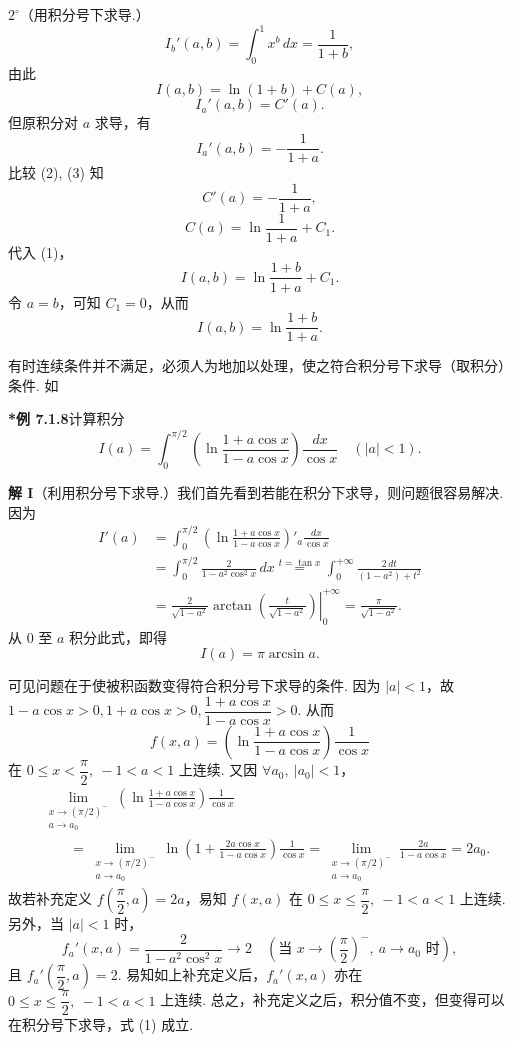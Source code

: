\documentclass[UTF8,12pt,a4paper,fontset=fandol]{ctexart}
\begin{document}
$2^\circ$（用积分号下求导.）
\[
I_b'(a,b)=\int_0^1x^b\,dx=\frac1{1+b},
\]
由此
\begin{equation}
I(a,b)=\ln(1+b)+C(a),
\tag{1}
\end{equation}
\begin{equation}
I_a'(a,b)=C'(a).
\tag{2}
\end{equation}
但原积分对 $a$ 求导，有
\begin{equation}
I_a'(a,b)=-\frac1{1+a}.
\tag{3}
\end{equation}
比较 (2), (3) 知
\[
C'(a)=-\frac1{1+a},
\]
\[
C(a)=\ln\frac1{1+a}+C_1.
\]
代入 (1)，
\[
I(a,b)=\ln\frac{1+b}{1+a}+C_1.
\]
令 $a=b$，可知 $C_1=0$，从而
\[
I(a,b)=\ln\frac{1+b}{1+a}.
\]

有时连续条件并不满足，必须人为地加以处理，使之符合积分号下求导（取积分）条件. 如

\noindent\textbf{*例 7.1.8}\quad 计算积分
\[
I(a)=\int_0^{\pi/2}\left(\ln\frac{1+a\cos x}{1-a\cos x}\right)\frac{dx}{\cos x}\quad(|a|<1).
\]

\noindent\textbf{解 I}\quad （利用积分号下求导.）我们首先看到若能在积分下求导，则问题很容易解决. 因为
\[
\begin{aligned}
I'(a)
&=\int_0^{\pi/2}\left(\ln\frac{1+a\cos x}{1-a\cos x}\right)'_a\frac{dx}{\cos x}\\
&=\int_0^{\pi/2}\frac{2}{1-a^2\cos^2x}\,dx
\stackrel{t=\tan x}{=}\int_0^{+\infty}\frac{2\,dt}{(1-a^2)+t^2}\\
&=\left.\frac{2}{\sqrt{1-a^2}}
\arctan\left(\frac{t}{\sqrt{1-a^2}}\right)\right|_0^{+\infty}
=\frac{\pi}{\sqrt{1-a^2}}.
\end{aligned}
\tag{1}
\]
从 $0$ 至 $a$ 积分此式，即得
\[
I(a)=\pi\arcsin a.
\]

可见问题在于使被积函数变得符合积分号下求导的条件. 因为 $|a|<1$，故 $1-a\cos x>0,1+a\cos x>0,\dfrac{1+a\cos x}{1-a\cos x}>0$. 从而
\[
f(x,a)=\left(\ln\frac{1+a\cos x}{1-a\cos x}\right)\frac1{\cos x}
\]
在 $0\le x<\dfrac\pi2,\ -1<a<1$ 上连续. 又因 $\forall a_0,\ |a_0|<1$，
\[
\begin{aligned}
&\lim_{\substack{x\to(\pi/2)^-\\ a\to a_0}}
\left(\ln\frac{1+a\cos x}{1-a\cos x}\right)\frac1{\cos x}\\
&\qquad
=\lim_{\substack{x\to(\pi/2)^-\\ a\to a_0}}
\ln\left(1+\frac{2a\cos x}{1-a\cos x}\right)\frac1{\cos x}
=\lim_{\substack{x\to(\pi/2)^-\\ a\to a_0}}
\frac{2a}{1-a\cos x}=2a_0.
\end{aligned}
\]
故若补充定义 $f\left(\dfrac\pi2,a\right)=2a$，易知 $f(x,a)$ 在 $0\le x\le\dfrac\pi2,\ -1<a<1$ 上连续. 另外，当 $|a|<1$ 时，
\[
f_a'(x,a)=\frac2{1-a^2\cos^2x}\to2
\quad\left(\text{当 }x\to\left(\frac\pi2\right)^-,\ a\to a_0\text{ 时}\right),
\]
且 $f_a'\left(\dfrac\pi2,a\right)=2$. 易知如上补充定义后，$f_a'(x,a)$ 亦在 $0\le x\le\dfrac\pi2,\ -1<a<1$ 上连续. 总之，补充定义之后，积分值不变，但变得可以在积分号下求导，式 (1) 成立.
\end{document}
